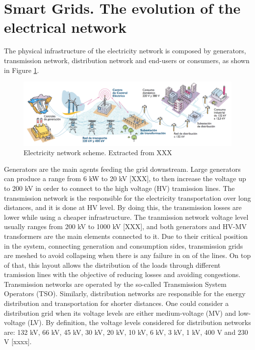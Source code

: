 \section{Smart Grids. The evolution of the electrical network}

The physical infrastructure of the electricity network is composed by generators, transmission network, distribution network and end-users or consumers, as shown in Figure \ref{fig:ree}. 

\begin{figure}[h]
	\centering 
	\includegraphics[width=0.8\columnwidth ]{ChapterIntro/Figures/ree.png}
		\caption{Electricity network scheme. Extracted from XXX}  
		\label{fig:ree}
\end{figure}

Generators are the main agents feeding the grid downstream. Large generators can produce a range from 6 kW to 20 kV [XXX], to then increase the voltage up to 200 kV in order to connect to the high voltage (HV) tramission lines. The transmission network is the responsible for the electricity transportation over long distances, and it is done at HV level. By doing this, the transmission losses are lower while using a cheaper infrastructure. The tranmission network voltage level usually ranges from 200 kV to 1000 kV [XXX], and both generators and HV-MV transformers are the main elements connected to it. Due to their critical position in the system, connecting generation and consumption sides, transmission grids are meshed to avoid collapsing when there is any failure in on of the lines. On top of that, this layout allows the distribution of the loads through different tramission lines with the objective of reducing losses and avoiding congestions. Transmission networks are operated by the so-called Transmission System Operators (TSO). Similarly, distribution networks are responsible for the energy distribution and transportation for shorter distances. One could consider a distribution grid when its voltage levels are either medium-voltage (MV) and low-voltage (LV). By definition, the voltage levels considered for distribution networks are: 132 kV, 66 kV, 45 kV, 30 kV, 20 kV, 10 kV, 6 kV, 3 kV, 1 kV, 400 V and 230 V [xxxx]. 

